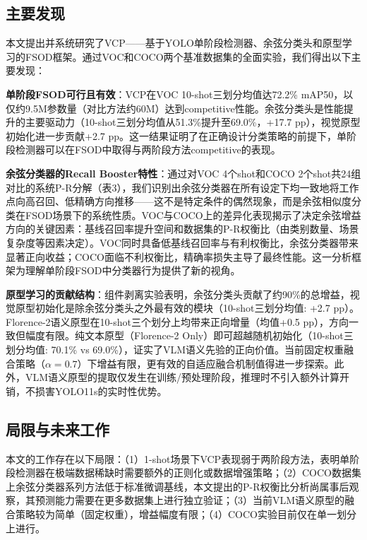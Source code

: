 \documentclass[zihao=5,a4paper,twocolumn]{ctexart}
\begin{document}
\subsection{主要发现}

本文提出并系统研究了VCP——基于YOLO单阶段检测器、余弦分类头和原型学习的FSOD框架。通过VOC和COCO两个基准数据集的全面实验，我们得出以下主要发现：

\textbf{单阶段FSOD可行且有效}：VCP在VOC 10-shot三划分均值达72.2\% mAP50，以仅约9.5M参数量（对比方法约60M）达到competitive性能。余弦分类头是性能提升的主要驱动力（10-shot三划分均值从51.3\%提升至69.0\%，+17.7 pp），视觉原型初始化进一步贡献+2.7 pp。这一结果证明了在正确设计分类策略的前提下，单阶段检测器可以在FSOD中取得与两阶段方法competitive的表现。

\textbf{余弦分类器的Recall Booster特性}：通过对VOC 4个shot和COCO 2个shot共24组对比的系统P-R分解（表3），我们识别出余弦分类器在所有设定下均一致地将工作点向高召回、低精确方向推移——这不是特定条件的偶然现象，而是余弦相似度分类在FSOD场景下的系统性质。VOC与COCO上的差异化表现揭示了决定余弦增益方向的关键因素：基线召回率提升空间和数据集的P-R权衡比（由类别数量、场景复杂度等因素决定）。VOC同时具备低基线召回率与有利权衡比，余弦分类器带来显著正向收益；COCO面临不利权衡比，精确率损失主导了最终性能。这一分析框架为理解单阶段FSOD中分类器行为提供了新的视角。

\textbf{原型学习的贡献结构}：组件剥离实验表明，余弦分类头贡献了约90\%的总增益，视觉原型初始化是除余弦分类头之外最有效的模块（10-shot三划分均值: +2.7 pp）。Florence-2语义原型在10-shot三个划分上均带来正向增量（均值+0.5 pp），方向一致但幅度有限。纯文本原型（Florence-2 Only）即可超越随机初始化（10-shot三划分均值: 70.1\% vs 69.0\%），证实了VLM语义先验的正向价值。当前固定权重融合策略（$\alpha=0.7$）下增益有限，更有效的自适应融合机制值得进一步探索。此外，VLM语义原型的提取仅发生在训练/预处理阶段，推理时不引入额外计算开销，不损害YOLO11s的实时性优势。

\subsection{局限与未来工作}

本文的工作存在以下局限：（1）1-shot场景下VCP表现弱于两阶段方法，表明单阶段检测器在极端数据稀缺时需要额外的正则化或数据增强策略；（2）COCO数据集上余弦分类器系列方法低于标准微调基线，本文提出的P-R权衡比分析尚属事后观察，其预测能力需要在更多数据集上进行独立验证；（3）当前VLM语义原型的融合策略较为简单（固定权重），增益幅度有限；（4）COCO实验目前仅在单一划分上进行。
\end{document}
